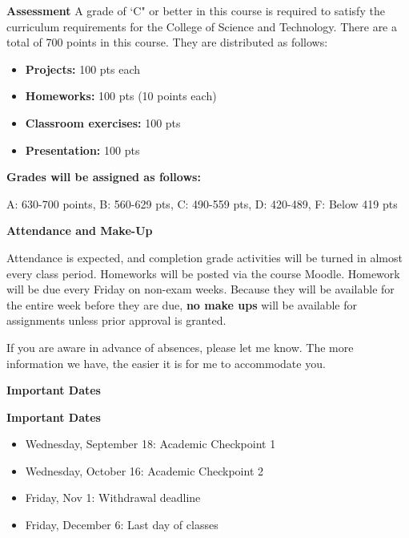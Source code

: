 \documentclass[12pt]{article}
\let\oldtextbf\textbf
\renewcommand{\textbf}[1]{\textcolor{coolblack}{\oldtextbf{#1}}}
\begin{document}
\bigskip

\begin{flushleft}
\textbf{Assessment}
A grade of `C" or better in this course is required to satisfy the curriculum requirements for the College of Science and Technology. There are a total of 700 points in this course. They are distributed as follows:

\begin{itemize}
\item \textbf{Projects:} 100 pts each
\item \textbf{Homeworks:} 100 pts (10 points each)
\item \textbf{Classroom exercises:} 100 pts
\item \textbf{Presentation:} 100 pts
\end{itemize}

\bigskip

\textbf{Grades will be assigned as follows:}

A: 630-700 points, B: 560-629 pts, C: 490-559 pts, D: 420-489, F: Below 419 pts

\end{flushleft}

\bigskip

\begin{flushleft}
\textbf{Attendance and Make-Up}
\end{flushleft}

 Attendance is expected, and completion grade activities will be turned in almost every class period. Homeworks will be posted via the course Moodle. Homework will be due every Friday on non-exam weeks. Because they will be available for the entire week before they are due, \textbf{no make ups} will be available for assignments unless prior approval is granted. \par
 If you are aware in advance of absences, please let me know. The more information we have, the easier it is for me to accommodate you. \par

\begin{flushleft}
\textbf{Important Dates}
\end{flushleft}

\begin{flushleft}
\textbf{Important Dates}
\end{flushleft}

\begin{itemize}
\item Wednesday, September 18: Academic Checkpoint 1
\item Wednesday, October 16: Academic Checkpoint 2
\item Friday, Nov 1: Withdrawal deadline
\item Friday, December 6: Last day of classes

\end{itemize}
\end{document}

